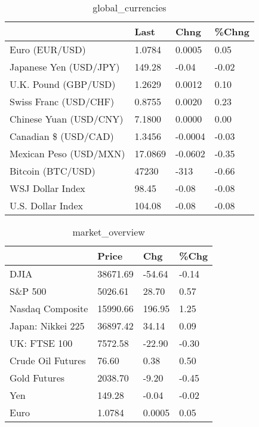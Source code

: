 \documentclass{article}%
\begin{document}
%


\begin{table}[htbp]%
\caption{global\_currencies}%
\centering%
\begin{adjustbox}{width=1\textwidth}%
\begin{tabular}{llll}
\toprule
                       &    Last &    Chng & \%Chng \\
\midrule
        Euro (EUR/USD) &  1.0784 &  0.0005 &  0.05 \\
Japanese Yen (USD/JPY) &  149.28 &   -0.04 & -0.02 \\
  U.K. Pound (GBP/USD) &  1.2629 &  0.0012 &  0.10 \\
 Swiss Franc (USD/CHF) &  0.8755 &  0.0020 &  0.23 \\
Chinese Yuan (USD/CNY) &  7.1800 &  0.0000 &  0.00 \\
  Canadian \$ (USD/CAD) &  1.3456 & -0.0004 & -0.03 \\
Mexican Peso (USD/MXN) & 17.0869 & -0.0602 & -0.35 \\
     Bitcoin (BTC/USD) &   47230 &    -313 & -0.66 \\
      WSJ Dollar Index &   98.45 &   -0.08 & -0.08 \\
     U.S. Dollar Index &  104.08 &   -0.08 & -0.08 \\
\bottomrule
\end{tabular}
%
\end{adjustbox}%
\end{table}

%


\begin{table}[htbp]%
\caption{market\_overview}%
\centering%
\begin{adjustbox}{width=1\textwidth}%
\begin{tabular}{llll}
\toprule
                  &    Price &    Chg &  \%Chg \\
\midrule
             DJIA & 38671.69 & -54.64 & -0.14 \\
          S\&P 500 &  5026.61 &  28.70 &  0.57 \\
 Nasdaq Composite & 15990.66 & 196.95 &  1.25 \\
Japan: Nikkei 225 & 36897.42 &  34.14 &  0.09 \\
     UK: FTSE 100 &  7572.58 & -22.90 & -0.30 \\
Crude Oil Futures &    76.60 &   0.38 &  0.50 \\
     Gold Futures &  2038.70 &  -9.20 & -0.45 \\
              Yen &   149.28 &  -0.04 & -0.02 \\
             Euro &   1.0784 & 0.0005 &  0.05 \\
\bottomrule
\end{tabular}
%
\end{adjustbox}%
\end{table}

%
\end{document}
